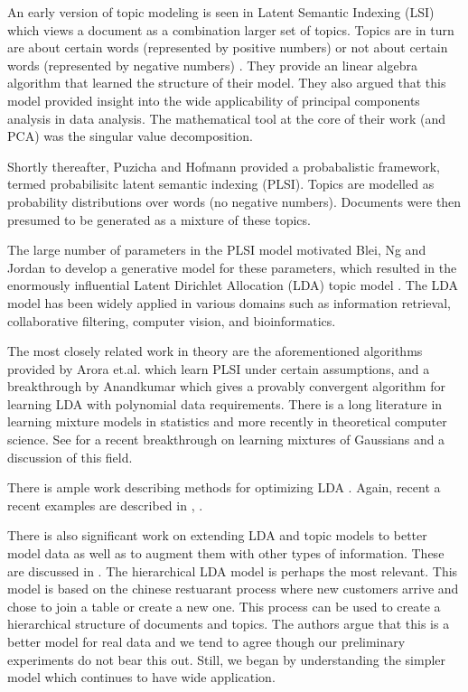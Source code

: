 An early version of topic modeling is seen in Latent Semantic
Indexing (LSI) which views a document as a combination larger
set of topics.  Topics are in turn are about certain words
(represented by positive numbers) or not about certain words
(represented by negative numbers) \cite{Papadimitriou1997}.  They
provide an linear algebra algorithm that learned the structure
of their model.  They also argued that this model provided
insight into the wide applicability of principal
components analysis in data analysis. The mathematical tool at the core
of their work (and PCA) was the singular value
decomposition.

Shortly thereafter, Puzicha and Hofmann \cite{Hofmann04} provided a
probabalistic framework, termed probabilisitc latent
semantic indexing (PLSI). Topics are modelled as probability
distributions over words (no negative numbers). Documents were
then presumed to be generated as a mixture of these
topics. 

The large number of parameters in the PLSI model motivated
Blei, Ng and Jordan to develop a generative model for these parameters,
which resulted in the enormously influential Latent Dirichlet
Allocation (LDA) topic model \cite{Blei2003a}. The LDA model has been 
widely applied in various domains such as information
retrieval, collaborative filtering, computer vision, and bioinformatics.

The most closely related work in theory are the aforementioned
algorithms provided by Arora et.al. \cite{Arora2012} which learn PLSI
under certain assumptions, and a breakthrough by
Anandkumar\cite{AnandLDA} which gives a provably convergent algorithm
for learning LDA with polynomial data requirements.  There is a long
literature in learning mixture models in statistics and
more recently in theoretical computer science. See
\cite{MoitraValiant} for a recent breakthrough on learning mixtures of
Gaussians and a discussion of this field.

There is ample work describing methods for optimizing
LDA \cite{BleiCACM}.  Again, recent a recent examples are described
in \cite{McCallumMALLET}, \cite{BleiCBA}. 

There is also significant work on extending LDA and topic models to
better model data as well as to augment them with other types of
information.  These are discussed in \cite{BleiCACM}.  The
hierarchical LDA model \cite{BleiCM} is perhaps the most relevant.
This model is based on the chinese restuarant process where new
customers arrive and chose to join a table or create a new one.  This
process can be used to create a hierarchical structure of documents
and topics. The authors argue that this is a better model for real
data and we tend to agree though our preliminary experiments do not
bear this out.  Still, we began by understanding the simpler model
which continues to have wide application.  

